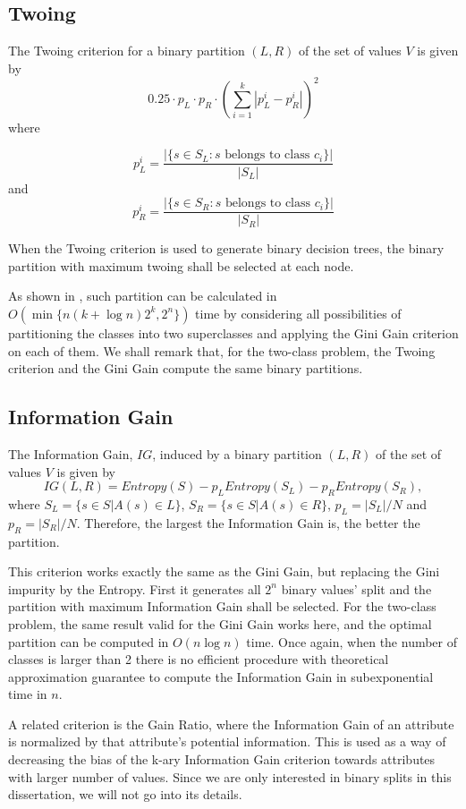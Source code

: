 \subsection{Twoing}
The Twoing criterion
for a  binary partition $(L,R)$ 
of the set of values $V$ is given by
$$ 0.25 \cdot p_L \cdot p_R  \cdot \left ( \sum_{i=1}^k | p_L^i - p_R^i | \right )^2$$
where

$$ p_L^i= \frac{|\{s \in S_L: s \mbox{ belongs to class } c_i \}|}{ |S_L|} $$
 and 
$$ p_R^i= \frac{|\{s \in S_R: s \mbox{ belongs to class } c_i\} |}{ |S_R|} $$

When the Twoing criterion is used to generate binary decision trees, the binary partition with maximum twoing shall be selected at each node. 

As shown in \cite{Breiman84}, such partition can be calculated in $O(\min \{ n (k + \log n) 2^k, 2^n \} )$
time by considering all possibilities of partitioning the classes into two superclasses
and applying the Gini Gain criterion on each of them. We shall remark that, for the two-class problem, the Twoing criterion and the Gini Gain compute the same binary partitions.

\subsection{Information Gain}

The Information Gain, $IG$, induced by a binary partition $(L,R)$ 
of the set of values $V$ is given by 
\begin{equation}
 IG(L,R) = Entropy(S) -
p_L Entropy(S_L) - p_R Entropy(S_R),
\label{eq:InformationGain}
\end{equation}
where $S_L= \{ s \in S | A(s) \in L \}$, $S_R= \{ s \in S | A(s) \in R \}$,
 $p_L=|S_L| /N $ and $p_R=|S_R| /N$. Therefore, the largest the Information Gain is, the better the partition.

This criterion works exactly the same as the Gini Gain, but replacing the Gini impurity by the Entropy. First it generates all $2^n$ binary values' split and the partition with maximum Information Gain shall be selected.
For the two-class problem, the same result valid for the Gini Gain works here, and the optimal partition  
can be computed in $O(n \log n)$ time. Once again, when the number of classes is larger than 2 there is no efficient procedure with theoretical approximation guarantee to compute the Information Gain in subexponential time in $n$.

A related criterion is the Gain Ratio, where the Information Gain of an attribute is normalized by that attribute's potential information. This is used as a way of decreasing the bias of the k-ary Information Gain criterion towards attributes with larger number of values. Since we are only interested in binary splits in this dissertation, we will not go into its details.


